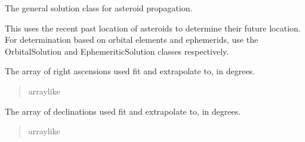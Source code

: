 \documentclass[letterpaper,11pt,english]{sphinxmanual}
\begin{document}
\begin{savenotes}
\begin{fulllineitems}
\sphinxAtStartPar
The general solution class for asteroid propagation.

\sphinxAtStartPar
This uses the recent past location of asteroids to determine their
future location. For determination based on orbital elements and
ephemerids, use the OrbitalSolution and EphemeriticSolution classes
respectively.

\begin{savenotes}\begin{fulllineitems}
\label{\detokenize{code/opihiexarata.propagate.solution:opihiexarata.propagate.solution.PropagativeSolution.ra_array}}
\pysigstartsignatures
{}
\pysigstopsignatures
\sphinxAtStartPar
The array of right ascensions used fit and extrapolate to,
in degrees.
\begin{quote}\begin{description}
\sphinxAtStartPar
array\sphinxhyphen{}like

\end{description}\end{quote}

\end{fulllineitems}\end{savenotes}


\begin{savenotes}\begin{fulllineitems}
\label{\detokenize{code/opihiexarata.propagate.solution:opihiexarata.propagate.solution.PropagativeSolution.dec_array}}
\pysigstartsignatures
{}
\pysigstopsignatures
\sphinxAtStartPar
The array of declinations used fit and extrapolate to, in degrees.
\begin{quote}\begin{description}
\sphinxAtStartPar
array\sphinxhyphen{}like

\end{description}\end{quote}

\end{fulllineitems}\end{savenotes}


\end{fulllineitems}
\end{savenotes}
\end{document}
